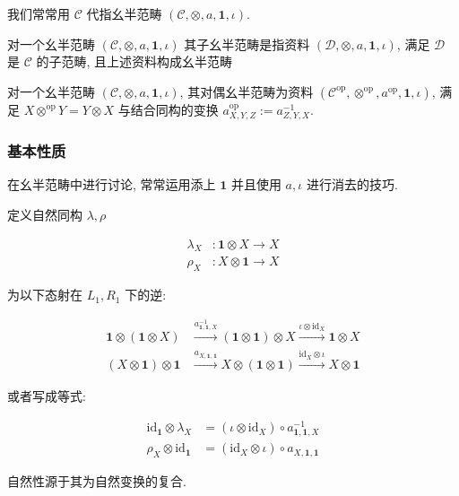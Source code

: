 我们常常用 \(\mathcal{C}\) 代指幺半范畴 \((\mathcal{C},\otimes,a,\mathbf{1},\iota)\).

\begin{definition}[子幺半范畴]
    对一个幺半范畴 \((\mathcal{C}, \otimes,a,\mathbf{1},\iota)\) 其子幺半范畴是指资料 \((\mathcal{D}, \otimes,a,\mathbf{1},\iota)\),
    满足 \(\mathcal{D}\) 是 \(\mathcal{C}\) 的子范畴, 且上述资料构成幺半范畴
\end{definition}

\begin{definition}[对偶幺半范畴]
    对一个幺半范畴 \((\mathcal{C}, \otimes,a,\mathbf{1},\iota)\), 其对偶幺半范畴为资料 \((\mathcal{C}^{\mathrm{op}}, \otimes^\mathrm{op}, a^\mathrm{op},\mathbf{1},\iota)\),
    满足 \(X \otimes^\mathrm{op} Y = Y \otimes X\) 与结合同构的变换 \(a_{X,Y,Z}^{\mathrm{op}} := a_{Z,Y,X}^{-1}\).
\end{definition}

\subsubsection{基本性质}

在幺半范畴中进行讨论, 常常运用添上 \(\mathbf{1}\) 并且使用 \(a,\iota\) 进行消去的技巧.

\begin{definition}
    定义自然同构 \(\lambda,\rho\) 

    \[
        \begin{aligned}
            \lambda_X &: \mathbf{1} \otimes X \to X \\
            \rho_X &: X \otimes \mathbf{1} \to X
        \end{aligned}
    \]

    为以下态射在 \(L_1,R_1\) 下的逆:

    \[
        \begin{aligned}
            \mathbf{1} \otimes (\mathbf{1} \otimes X) &\xrightarrow{a_{\mathbf{1},\mathbf{1},X}^{-1}} (\mathbf{1} \otimes \mathbf{1}) \otimes X \xrightarrow{\iota \otimes \mathrm{id}_X} \mathbf{1} \otimes X \\
            (X \otimes \mathbf{1}) \otimes \mathbf{1} &\xrightarrow{a_{X,\mathbf{1},\mathbf{1}}} X \otimes (\mathbf{1} \otimes \mathbf{1}) \xrightarrow{\mathrm{id}_X \otimes \iota} X \otimes \mathbf{1}
        \end{aligned}
    \]

    或者写成等式:

    \[
        \begin{aligned}
            \mathrm{id}_{\mathbf{1}} \otimes \lambda_X &= (\iota \otimes \mathrm{id}_X) \circ a_{\mathbf{1},\mathbf{1},X}^{-1}\\
            \rho_X \otimes \mathrm{id}_{\mathbf{1}} &= (\mathrm{id}_X \otimes \iota) \circ a_{X,\mathbf{1},\mathbf{1}}
        \end{aligned}
    \]

    自然性源于其为自然变换的复合.
\end{definition}

